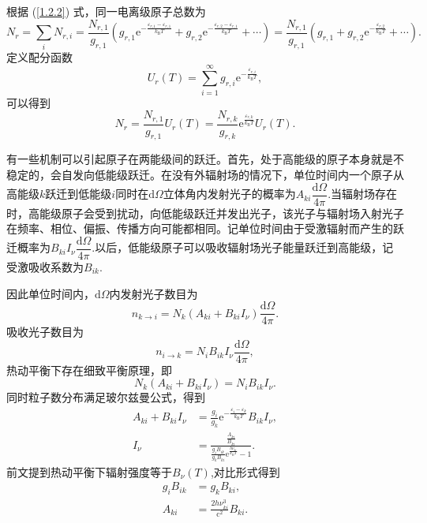 \documentclass[../天体物理基础.tex]{subfiles}
\begin{document}
根据 (\ref{1.2.2}) 式，同一电离级原子总数为
\begin{equation}
N_{r}=\sum_{i}N_{r,i}=\frac{N_{r,1}}{g_{r,1}}\left(g_{r,1}\mathrm{e}^{-\frac{\varepsilon_{r,1}-\varepsilon_{r,1}}{k_{\text{B}}T}}+g_{r,2}\mathrm{e}^{-\frac{\varepsilon_{r,2}-\varepsilon_{r,1}}{k_{\text{B}}T}}+\cdots\right)=\frac{N_{r,1}}{g_{r,1}}\left(g_{r,1}+g_{r,2}\mathrm{e}^{-\frac{\varepsilon_{r,2}}{k_{\text{B}}T}}+\cdots\right).
\end{equation}
定义配分函数
\begin{equation}
U_r(T)=\sum_{i=1}^\infty g_{r,i}\mathrm{e}^{-\frac{\varepsilon_{r,i}}{k_{\text{B}}T}},
\end{equation}
可以得到
\begin{equation}
N_{r}=\frac{N_{r,1}}{g_{r,1}}U_r(T)=\frac{N_{r,k}}{g_{r,k}}\mathrm{e}^{\frac{\varepsilon_{r,k}}{k_{\text{B}}T}}U_r(T).
\end{equation}

有一些机制可以引起原子在两能级间的跃迁。首先，处于高能级的原子本身就是不稳定的，会自发向低能级跃迁。在没有外辐射场的情况下，单位时间内一个原子从高能级$k$跃迁到低能级$i$同时在$\mathrm{d}\Omega$立体角内发射光子的概率为$A_{ki}\dfrac{\mathrm{d}\Omega}{4\pi}$.当辐射场存在时，高能级原子会受到扰动，向低能级跃迁并发出光子，该光子与辐射场入射光子在频率、相位、偏振、传播方向可能都相同。记单位时间由于受激辐射而产生的跃迁概率为$B_{ki}I_{\nu}\dfrac{\mathrm{d}\Omega}{4\pi}$.以后，低能级原子可以吸收辐射场光子能量跃迁到高能级，记受激吸收系数为$B_{ik}$.

因此单位时间内，$\mathrm{d}\Omega$内发射光子数目为
\begin{equation}
n_{k\to i}=N_k(A_{ki}+B_{ki}I_\nu)\frac{\mathrm{d}\Omega}{4\pi}.
\end{equation}
吸收光子数目为
\begin{equation}
n_{i\to k}=N_iB_{ik}I_\nu\frac{\mathrm{d}\Omega}{4\pi},
\end{equation}
热动平衡下存在细致平衡原理，即
\begin{equation}
N_k(A_{ki}+B_{ki}I_\nu)=N_iB_{ik}I_\nu.
\end{equation}
同时粒子数分布满足玻尔兹曼公式，得到
\begin{align}
A_{ki}+B_{ki}I_\nu&=\frac{g_i}{g_k}\mathrm{e}^{-\frac{\varepsilon_i-\varepsilon_k}{k_{\text{B}}T}}B_{ik}I_\nu,\\
I_\nu&=\frac{\frac{A_{ki}}{B_{ki}}}{\frac{g_iB_{ik}}{g_kB_{ki}}\mathrm{e}^\frac{h\nu_{ki}}{k_{\text{B}}T}-1}.
\end{align}
前文提到热动平衡下辐射强度等于$B_\nu(T)$,对比形式得到
\begin{align}
g_iB_{ik}&=g_kB_{ki},\\
A_{ki}&=\frac{2h\nu_{ki}^3}{\mathrm{c}^{2}}B_{ki}.
\end{align}
\end{document}
